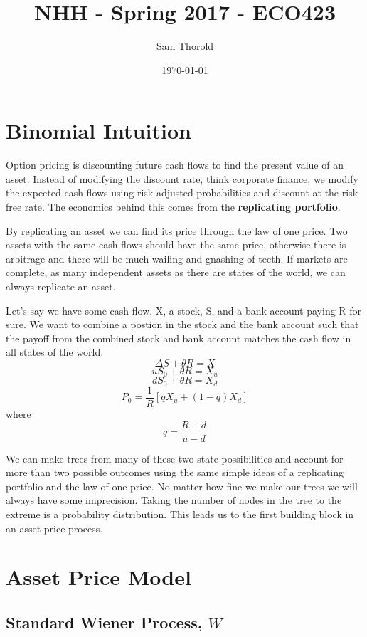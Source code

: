 \documentclass[12pt]{article}
\begin{document}
\title{NHH - Spring 2017 - ECO423}
\author{Sam Thorold}
\date{\today}
\maketitle

\tableofcontents
\pagebreak

\section{Binomial Intuition}

Option pricing is discounting future cash flows to find the present value of an
asset. Instead of modifying the discount rate, think corporate finance, we
modify the expected cash flows using risk adjusted probabilities and discount
at the risk free rate. The economics behind this comes from the
\textbf{replicating portfolio}.

By replicating an asset we can find its price through the law
of one price. Two assets with the same cash flows should have the same
price, otherwise there is arbitrage and there will be much wailing and gnashing
of teeth. If markets are complete, as many independent assets as there
are states of the world, we can always replicate an asset.

Let's say we have some cash flow, X, a stock, S, and a bank account paying R
for sure. We want to combine a postion in the stock and the bank account such
that the payoff from the combined stock and bank account matches the cash flow
in all states of the world.
$$\Delta S+\theta R=X$$
$$uS_0+\theta R=X_u$$
$$dS_0+\theta R=X_d$$
$$P_0=\frac{1}{R}[qX_u+(1-q)X_d]$$ where $$ q=\frac{R-d}{u-d}$$

We can make trees from many of these two state possibilities and account for
more than two possible outcomes using the same simple ideas of a replicating
portfolio and the law of one price. No matter how fine we make our trees we
will always have some imprecision. Taking the number of nodes in the tree to
the extreme is a probability distribution. This leads us to the first building
block in an asset price process.

\pagebreak

\section{Asset Price Model}

\subsection{Standard Wiener Process, $W$}
\end{document}
